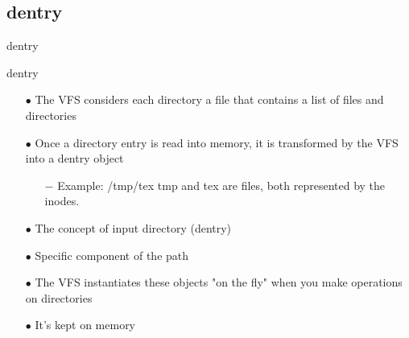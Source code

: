 \documentclass{beamer}
\begin{document}
\subsection{dentry}

\begin{frame}{dentry}
	
	
\end{frame}

\begin{frame}{dentry}
	
	\begin{itemize}[<+->]

		\item[$\bullet$]{The VFS considers each directory a file that contains a list of files and directories}
		\item[$\bullet$]{Once a directory entry is read into memory, it is transformed by the VFS into a dentry object}
			\begin{itemize}
				\item[$-$]{Example: /tmp/tex \newline tmp and tex are files, both represented by the inodes.}
			\end{itemize}
		\item[$\bullet$]{The concept of input directory (dentry)}
		\item[$\bullet$]{Specific component of the path}
		\item[$\bullet$]{The VFS instantiates these objects "on the fly" when you make operations on directories}
		\item[$\bullet$]{It's kept on memory}
	\end{itemize}

\end{frame}
\end{document}
